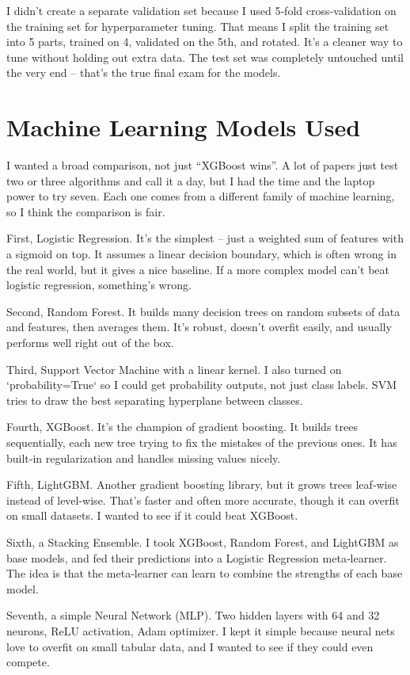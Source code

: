 \documentclass[11pt, a4paper, oneside]{book}
\begin{document}
I didn't create a separate validation set because I used 5‑fold cross‑validation on the training set for hyperparameter tuning. That means I split the training set into 5 parts, trained on 4, validated on the 5th, and rotated. It's a cleaner way to tune without holding out extra data. The test set was completely untouched until the very end – that's the true final exam for the models.

\section{Machine Learning Models Used}
I wanted a broad comparison, not just “XGBoost wins”. A lot of papers just test two or three algorithms and call it a day, but I had the time and the laptop power to try seven. Each one comes from a different family of machine learning, so I think the comparison is fair.

First, Logistic Regression. It's the simplest – just a weighted sum of features with a sigmoid on top. It assumes a linear decision boundary, which is often wrong in the real world, but it gives a nice baseline. If a more complex model can't beat logistic regression, something's wrong.

Second, Random Forest. It builds many decision trees on random subsets of data and features, then averages them. It's robust, doesn't overfit easily, and usually performs well right out of the box.

Third, Support Vector Machine with a linear kernel. I also turned on `probability=True` so I could get probability outputs, not just class labels. SVM tries to draw the best separating hyperplane between classes.

Fourth, XGBoost. It's the champion of gradient boosting. It builds trees sequentially, each new tree trying to fix the mistakes of the previous ones. It has built‑in regularization and handles missing values nicely.

Fifth, LightGBM. Another gradient boosting library, but it grows trees leaf‑wise instead of level‑wise. That's faster and often more accurate, though it can overfit on small datasets. I wanted to see if it could beat XGBoost.

Sixth, a Stacking Ensemble. I took XGBoost, Random Forest, and LightGBM as base models, and fed their predictions into a Logistic Regression meta‑learner. The idea is that the meta‑learner can learn to combine the strengths of each base model.

Seventh, a simple Neural Network (MLP). Two hidden layers with 64 and 32 neurons, ReLU activation, Adam optimizer. I kept it simple because neural nets love to overfit on small tabular data, and I wanted to see if they could even compete.
\end{document}
